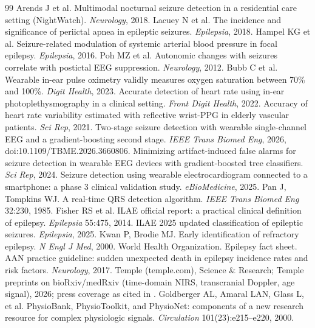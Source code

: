 \begin{thebibliography}{99}
 Arends J et al. Multimodal nocturnal seizure detection in a residential care setting (NightWatch). \emph{Neurology}, 2018.
 Lacuey N et al. The incidence and significance of periictal apnea in epileptic seizures. \emph{Epilepsia}, 2018.
 Hampel KG et al. Seizure-related modulation of systemic arterial blood pressure in focal epilepsy. \emph{Epilepsia}, 2016.
 Poh MZ et al. Autonomic changes with seizures correlate with postictal EEG suppression. \emph{Neurology}, 2012.
 Bubb C et al. Wearable in-ear pulse oximetry validly measures oxygen saturation between 70\% and 100\%. \emph{Digit Health}, 2023.
 Accurate detection of heart rate using in-ear photoplethysmography in a clinical setting. \emph{Front Digit Health}, 2022.
 Accuracy of heart rate variability estimated with reflective wrist-PPG in elderly vascular patients. \emph{Sci Rep}, 2021.
 Two-stage seizure detection with wearable single-channel EEG and a gradient-boosting second stage. \emph{IEEE Trans Biomed Eng}, 2026, doi:10.1109/TBME.2026.3660806.
 Minimizing artifact-induced false alarms for seizure detection in wearable EEG devices with gradient-boosted tree classifiers. \emph{Sci Rep}, 2024.
 Seizure detection using wearable electrocardiogram connected to a smartphone: a phase 3 clinical validation study. \emph{eBioMedicine}, 2025.
 Pan J, Tompkins WJ. A real-time QRS detection algorithm. \emph{IEEE Trans Biomed Eng} 32:230, 1985.
 Fisher RS et al. ILAE official report: a practical clinical definition of epilepsy. \emph{Epilepsia} 55:475, 2014.
 ILAE 2025 updated classification of epileptic seizures. \emph{Epilepsia}, 2025.
 Kwan P, Brodie MJ. Early identification of refractory epilepsy. \emph{N Engl J Med}, 2000.
 World Health Organization. Epilepsy fact sheet.
 AAN practice guideline: sudden unexpected death in epilepsy incidence rates and risk factors. \emph{Neurology}, 2017.
 Temple (temple.com), Science \& Research; Temple preprints on bioRxiv/medRxiv (time-domain NIRS, transcranial Doppler, age signal), 2026; press coverage as cited in .
 Goldberger AL, Amaral LAN, Glass L, et al. PhysioBank, PhysioToolkit, and PhysioNet: components of a new research resource for complex physiologic signals. \emph{Circulation} 101(23):e215--e220, 2000.

\end{thebibliography}
